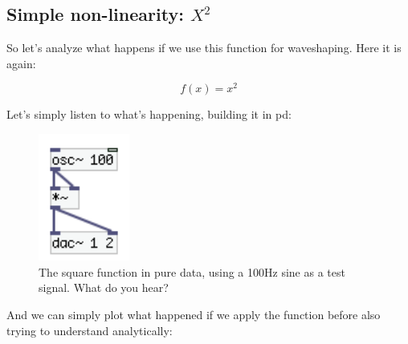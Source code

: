 



\subsection{Simple non-linearity: \(X ^2\)} %
\label{sub:nonLinearTrans}

So let's analyze what happens if we use this function for waveshaping. Here it is again:

\begin{equation}
f(x) = x ^ 2
\end{equation}



Let's simply listen to what's happening, building it in pd:

\begin{figure}[H]
	\begin{center}
		\includegraphics[width = 3cm]{img/pd_square.png}
		\caption{The square function in pure data, using a 100Hz sine as a test signal. What do you hear?}
		\label{fig:squarePd}
	\end{center}
\end{figure}



And we can simply plot what happened if we apply the function before also trying to understand analytically:



